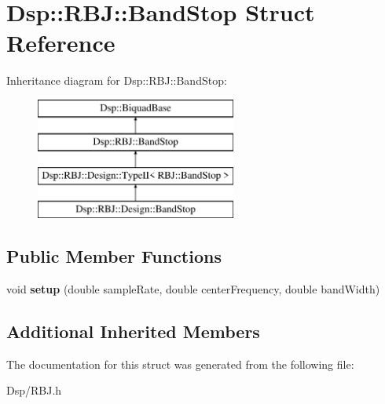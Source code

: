\hypertarget{structDsp_1_1RBJ_1_1BandStop}{\section{Dsp\-:\-:R\-B\-J\-:\-:Band\-Stop Struct Reference}
\label{structDsp_1_1RBJ_1_1BandStop}
}
Inheritance diagram for Dsp\-:\-:R\-B\-J\-:\-:Band\-Stop\-:\begin{figure}[H]
\begin{center}
\leavevmode
\includegraphics[height=4.000000cm]{structDsp_1_1RBJ_1_1BandStop}
\end{center}
\end{figure}
\subsection*{Public Member Functions}
\begin{DoxyCompactItemize}
\item 
\hypertarget{structDsp_1_1RBJ_1_1BandStop_a3795744bb875d828c663757945c96cfb}{void {\bfseries setup} (double sample\-Rate, double center\-Frequency, double band\-Width)}\label{structDsp_1_1RBJ_1_1BandStop_a3795744bb875d828c663757945c96cfb}

\end{DoxyCompactItemize}
\subsection*{Additional Inherited Members}


The documentation for this struct was generated from the following file\-:\begin{DoxyCompactItemize}
\item 
Dsp/R\-B\-J.\-h\end{DoxyCompactItemize}
